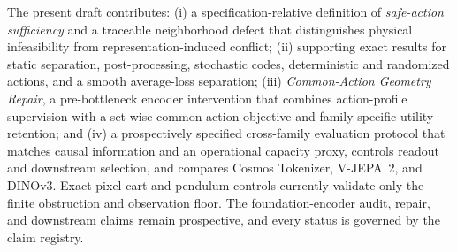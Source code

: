 The present draft contributes: (i) a specification-relative definition of \emph{safe-action
sufficiency} and a traceable neighborhood defect that distinguishes physical infeasibility from
representation-induced conflict; (ii) supporting exact results for static separation,
post-processing, stochastic codes, deterministic and randomized actions, and a smooth
average-loss separation; (iii) \emph{Common-Action Geometry Repair}, a pre-bottleneck encoder
intervention that combines action-profile supervision with a set-wise common-action objective and
family-specific utility retention; and (iv) a prospectively specified cross-family evaluation
protocol that matches causal information and an operational capacity proxy, controls readout and
downstream selection, and compares Cosmos Tokenizer,
V-JEPA~2, and DINOv3.  Exact pixel cart and pendulum controls currently validate only the finite
obstruction and observation floor.  The foundation-encoder audit, repair, and downstream claims
remain prospective, and every status is governed by the claim registry.
